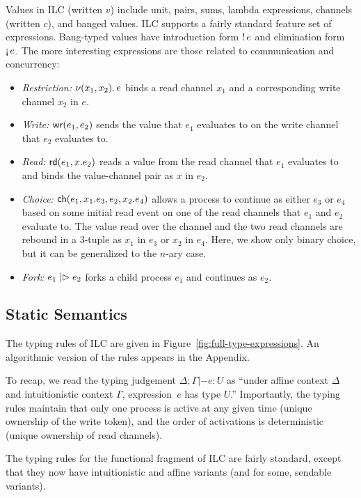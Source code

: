 Values in ILC (written $v$) include unit, pairs, sums, lambda expressions,
channels (written $c$), and banged values.  ILC supports a fairly standard
feature set of expressions. Bang-typed values have introduction form ${!}\,{e}$
and elimination form $\textnormal{!`}\,{e}$. The more interesting expressions are those
related to communication and concurrency:
\begin{itemize}[leftmargin=*]
  \item \emph{Restriction:} $\nu(x_1, x_2).\,e$ binds a read channel $x_1$ and
    a corresponding write channel $x_2$ in $e$.
  \item \emph{Write:} $\textnormal{\textsf{wr}}\mathsf{(}{e_1},{e_2}\mathsf{)}$ sends the value that $e_1$ evaluates to on
    the write channel that $e_2$ evaluates to.
  \item \emph{Read:} $\textnormal{\textsf{rd}}\mathsf{(}{e_1},{x}.{e_2}\mathsf{)}$ reads a value from the read channel
    that $e_1$ evaluates to and binds the value-channel pair as $x$ in $e_2$.
  \item \emph{Choice:} $\textnormal{\textsf{ch}}\mathsf{(}{e_1},{x_1}.{e_3},{e_2},{x_2}.{e_4}\mathsf{)}$ allows a
    process to continue as either $e_3$ or $e_4$ based on some initial read
    event on one of the read channels that $e_1$ and $e_2$ evaluate to. The value read
    over the channel and the two read channels are rebound in a 3-tuple as $x_1$
    in $e_3$ or $x_2$ in $e_4$. Here, we show only binary choice, but it can be
    generalized to the $n$-ary case.
  \item \emph{Fork:} $e_1 \mathrel{|\rhd} e_2$ forks a child process $e_1$ and
    continues as $e_2$.
\end{itemize}

\subsection{Static Semantics}
\label{subsec:types}

The typing rules of ILC are given in Figure~\ref{fig:full-type-expressions}. An
algorithmic version of the rules appears in the Appendix.

To recap, we read the typing judgement $\Delta; \Gamma |- e : U$ as ``under affine context
$\Delta$ and intuitionistic context $\Gamma$, expression~$e$ has type $U$.'' Importantly,
the typing rules maintain that only one process is active at any given time
(unique ownership of the write token), and the order of activations is
deterministic (unique ownership of read channels).

The typing rules for the functional fragment of ILC are fairly standard, except
that they now have intuitionistic and affine variants (and for some, sendable
variants).

